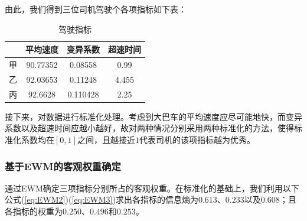 \documentclass[bwprint]{cumcmthesis}
\begin{document}
        由此，我们得到三位司机驾驶个各项指标如下表：
        
        \begin{table}[htbp]
            \centering
            \caption{驾驶指标}
                \begin{tabular}{|c|c|c|c|}
                \hline
                & 平均速度 & 变异系数 & 超速时间 \\
                \hline
                甲     & 90.77352 & 0.08558 & 0.99 \\
                \hline
                乙     & 92.03653 & 0.11248 & 4.455 \\
                \hline
                丙     & 92.6628 & 0.110428 & 2.25 \\
                \hline
                \end{tabular}
            \label{tab:seven}
          \end{table}

        接下来，对数据进行标准化处理。考虑到大巴车的平均速度应尽可能地快，而变异系数以及超速时间应越小越好，故对两种情况分别采用两种标准化的方法，使得标准化系数均在$[0,1]$之间，且越接近$1$代表司机的该项指标越为优秀。

            \subsubsection{基于EWM的客观权重确定}
            通过EWM确定三项指标分别所占的客观权重。在标准化的基础上，我们利用以下公式(\ref{eq:EWM2})(\ref{eq:EWM3})求出各指标的信息熵为$0.613$、$0.233$以及$0.608$；且各指标的权重为$0.250$、$0.496$和$0.253$。
\end{document}
